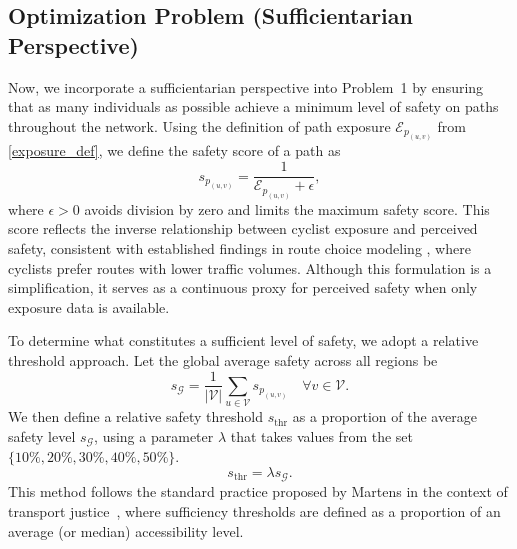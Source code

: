 \documentclass[letterpaper, 10 pt, conference]{ieeeconf}  %
\begin{document}
\subsection{Optimization Problem (Sufficientarian Perspective)}
\label{section_safety_metric}

Now, we incorporate a sufficientarian perspective into Problem~1 by ensuring that as many individuals as possible achieve a minimum level of safety on paths throughout the network. Using the definition of path exposure $\mathcal{E}_{p_{(u,v)}}$ from \eqref{exposure_def}, we define the safety score of a path as
\begin{equation}
    s_{p_{(u,v)}} = \frac{1}{\mathcal{E}_{p_{(u,v)}} + \epsilon},
\end{equation}
where $\epsilon > 0$ avoids division by zero and limits the maximum safety score. This score reflects the inverse relationship between cyclist exposure and perceived safety, consistent with established findings in route choice modeling \cite{casello2014modeling}, where cyclists prefer routes with lower traffic volumes. Although this formulation is a simplification, it serves as a continuous proxy for perceived safety when only exposure data is available. 

To determine what constitutes a sufficient level of safety, we adopt a relative threshold approach. Let the global average safety across all regions be
\begin{equation}
    s_{\mathcal{G}} = \frac{1}{|\mathcal{V}|} \sum_{u \in \mathcal{V}} s_{p_{(u,v)}} \quad \forall v \in \mathcal{V}.
\end{equation}
We then define a relative safety threshold $s_{\text{thr}}$ as a proportion of the average safety level $s_{\mathcal{G}}$, using a parameter $\lambda$ that takes values from the set $\{10\%, 20\%, 30\%, 40\%, 50\%\}$.
\begin{equation}
    s_{\text{thr}} = \lambda s_{\mathcal{G}}.
\end{equation}
This method follows the standard practice proposed by Martens in the context of transport justice~\cite{martens2017transport, martens2022equity}, where sufficiency thresholds are defined as a proportion of an average (or median) accessibility level.
\end{document}
